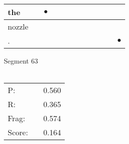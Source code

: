 \documentclass[landscape]{article}
\newcommand{\ssp}{\hspace{2pt}}
\newcommand{\mex}{\cellcolor{g}$\bullet$}
\begin{document}
\begin{tabular}{|l|p{10pt}|p{10pt}|p{10pt}|p{10pt}|p{10pt}|p{10pt}|p{10pt}|p{10pt}|p{10pt}|p{10pt}|p{10pt}|}
\hline
\ssp \cellcolor{ref1}the \ssp&\hspace{2pt}&\hspace{2pt}\mex&\hspace{2pt}&\hspace{2pt}&\hspace{2pt}&\hspace{2pt}&\hspace{2pt}&\hspace{2pt}&\hspace{2pt}&\hspace{2pt}&\hspace{2pt}\\
\hline
\ssp nozzle \ssp&\hspace{2pt}&\hspace{2pt}&\hspace{2pt}&\hspace{2pt}&\hspace{2pt}&\hspace{2pt}&\hspace{2pt}&\hspace{2pt}&\hspace{2pt}&\hspace{2pt}&\hspace{2pt}\\
\hline
\ssp \cellcolor{ref10}. \ssp&\hspace{2pt}&\hspace{2pt}&\hspace{2pt}&\hspace{2pt}&\hspace{2pt}&\hspace{2pt}&\hspace{2pt}&\hspace{2pt}&\hspace{2pt}&\hspace{2pt}&\hspace{2pt}\mex\\
\hline
\end{tabular}

\vspace{6pt}
\noindent Segment 63\\\\
\noindent\begin{tabular}{lm{12pt}r}
\hline
P:&&0.560\\
R:&&0.365\\
Frag:&&0.574\\
Score:&&0.164\\
\end{tabular}
\end{document}
